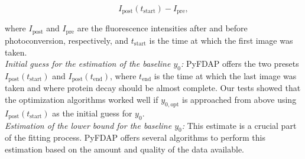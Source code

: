 \documentclass[a4paper,11pt]{article}
\begin{document}
\begin{equation*}
 I_{\mathrm{post}}(t_{\mathrm{start}})-I_{\mathrm{pre}},
\end{equation*}

\noindent where $I_{\mathrm{post}}$ and $I_{\mathrm{pre}}$ are the fluorescence intensities after and before photoconversion, respectively, and $t_{\mathrm{start}}$ is the time at which the first image was taken. \\

\noindent \textit{Initial guess for the estimation of the baseline $y_0$:} PyFDAP offers the two presets $I_{\mathrm{post}}(t_{\mathrm{start}})$ and $I_{\mathrm{post}}(t_{\mathrm{end}})$, where $t_{\mathrm{end}}$ is the time at which the last image was taken and where protein decay should be almost complete. Our tests showed that the optimization algorithms worked well if $y_{0,\mathrm{opt}}$ is approached from above using $I_{\mathrm{post}}(t_{\mathrm{start}})$ as the initial guess for $y_0$.\\

\noindent \textit{Estimation of the lower bound for the baseline $y_0$:} This estimate is a crucial part of the fitting process. PyFDAP offers several algorithms to perform this estimation based on the amount and quality of the data available. 
\end{document}
